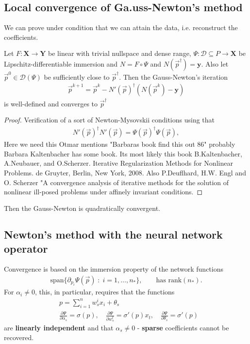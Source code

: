 \subsection{Local convergence of Ga.uss-Newton's method}
We can prove under condition that we can attain the data, i.e. reconstruct
the coefficients.
\begin{theorem}
    Let $F: \mathbf{X} \to \mathbf{Y}$ be linear with trivial nullspace and
    dense range, $\Psi:\mathcal{D} \subseteq P \to \mathbf{X}$ be
    Lipschitz-differentiable immersion and $N = F\circ \Psi$ and
    $N(\vec{p}^{\dagger}) = \mathbf{y}$.
    Also let $\vec{p}^{0} \in \mathcal{D}(\Psi)$ be sufficiently close to
    $\vec{p}^{\dagger}$. Then the Gauss-Newton's iteration
    \begin{align}
        \vec{p}^{k+1} = \vec{p}^{k} - N'(\vec{p})^{\dagger}
        \left( N\left( \vec{p}^{k} \right) - \mathbf{y} \right)
    \end{align}
    is well-defined and converges to $\vec{p}^{\dagger}$
\end{theorem}
\begin{proof}
    Verification of a sort of Newton-Mysovskii conditions using that
    \begin{align}
        N'(\vec{p})^{\dagger}N'(\vec{p}) =
        \Psi(\vec{p})^{\dagger}\Psi(\vec{p}),
    \end{align}
    Here we need this Otmar mentions "Barbaras book find this out 86"
    probably Barbara Kaltenbacher has some book. Its most likely this book
    B.Kaltenbacher, A.Neubauer, and O.Scherzer.
    Iterative Regularization Methods for Nonlinear Problems.
    de Gruyter, Berlin, New York, 2008.
    Also P.Deuflhard, H.W. Engl and O. Scherzer "A convergence analysis of
    iterative methods for the solution of nonlinear ill-posed problems under
    affinely invariant conditions.
\end{proof}
Then the Gauss-Newton is quadratically convergent.
\subsection{Newton's method with the neural network operator}
Convergence is based on the immersion property of the network functions
\begin{align}
    \text{span}\{\partial_{p_i}\Psi(\vec{p})\;:\;i=1,\ldots,n_*\}, \qquad
    \text{has rank}(n_*).
\end{align}
For $\alpha_i \neq 0$, this, in particular, requires that the functions
\begin{align}
    &p = \sum_{i=1}^{n}w_s^{i}x_i + \theta_s \\
    & \frac{\partial \Psi}{\partial \alpha_s} =\sigma(p),\quad
     \frac{\partial \Psi}{\partial w_s^{t}} =\sigma'(p)x_t,\quad
     \frac{\partial \Psi}{\partial \theta_s} =\sigma'(p)
\end{align}
are \textbf{linearly independent} and that $\alpha_s \neq 0$ -
\textbf{sparse} coefficients cannot be recovered.





